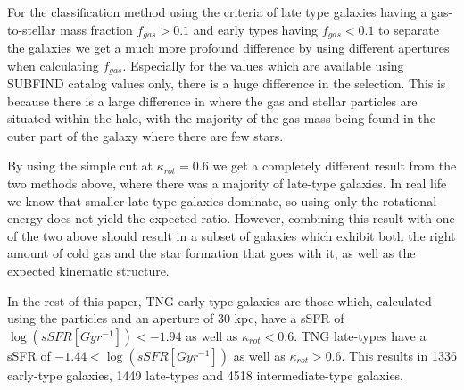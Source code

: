 For the classification method using the criteria of late type galaxies having a gas-to-stellar mass fraction $f_{gas} > 0.1$ and early types having $f_{gas} < 0.1$ to separate the galaxies we get a much more profound difference by using different apertures when calculating $f_{gas}$. Especially for the values which are available using SUBFIND catalog values only, there is a huge difference in the selection. This is because there is a large difference in where the gas and stellar particles are situated within the halo, with the majority of the gas mass being found in the outer part of the galaxy where there are few stars.

By using the simple cut at $\kappa_{rot} = 0.6$ we get a completely different result from the two methods above, where there was a majority of late-type galaxies. In real life we know that smaller late-type galaxies dominate, so using only the rotational energy does not yield the expected ratio. However, combining this result with one of the two above should result in a subset of galaxies which exhibit both the right amount of cold gas and the star formation that goes with it, as well as the expected kinematic structure.

In the rest of this paper, TNG early-type galaxies are those which, calculated using the particles and an aperture of 30 kpc, have a sSFR of $\log (sSFR[Gyr^{-1}]) < -1.94$ as well as $\kappa_{rot} < 0.6$. TNG late-types have a sSFR of $ -1.44 < \log (sSFR[Gyr^{-1}]) $ as well as $\kappa_{rot} > 0.6$. This results in 1336 early-type galaxies, 1449 late-types and 4518 intermediate-type galaxies.

